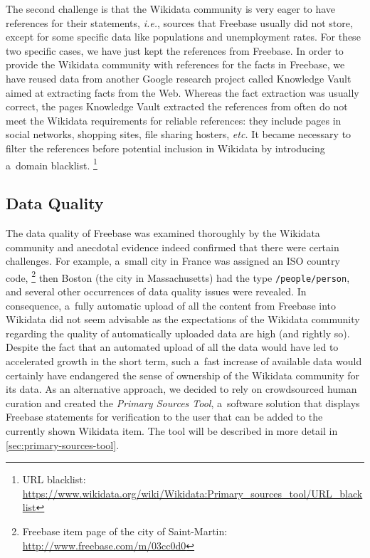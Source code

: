 \documentclass{sig-alternate}
\begin{document}
The second challenge is that the Wikidata community is very eager to have references
for their statements, \emph{i.e.}, sources that Freebase usually did not store,
except for some specific data like populations and unemployment rates.
For these two specific cases, we have just kept the references from Freebase.
In order to provide the Wikidata community with references for the facts in Freebase,
we have reused data from another Google research project
called Knowledge Vault~\cite{dong2014knowledge} aimed at extracting facts from the Web.
Whereas the fact extraction was usually correct, the pages Knowledge Vault extracted
the references from often do not meet the Wikidata requirements for reliable references:
they include pages in social networks, shopping sites, file sharing hosters, \emph{etc.}
It became necessary to filter the references before potential inclusion in Wikidata
by introducing a~domain blacklist.%
\footnote{URL blacklist:
\url{https://www.wikidata.org/wiki/Wikidata:Primary_sources_tool/URL_blacklist}}

\subsection{Data Quality}
\label{sec:dataquality}

The data quality of Freebase was examined thoroughly by the Wikidata community
and anecdotal evidence indeed confirmed that there were certain challenges.
For example, a~small city in France was assigned an ISO country code,%
\footnote{Freebase item page of the city of Saint-Martin: \url{http://www.freebase.com/m/03cc0d0}}
then Boston (the city in Massachusetts) had the type \texttt{/people/person},
and several other occurrences of data quality issues were revealed.
In consequence, a~fully automatic upload of all the content from Freebase into Wikidata
did not seem advisable as the expectations of the Wikidata community regarding the
quality of automatically uploaded data are high (and rightly so).
Despite the fact that an automated upload of all the data
would have led to accelerated growth in the short term,
such a~fast increase of available data would certainly have endangered
the sense of ownership of the Wikidata community for its data.
As an alternative approach, we decided to rely on crowdsourced human curation
and created the \emph{Primary Sources Tool},
a~software solution that displays Freebase statements
for verification to the user that can be added to the currently shown Wikidata item.
The tool will be described in more detail in \autoref{sec:primary-sources-tool}.
\end{document}

